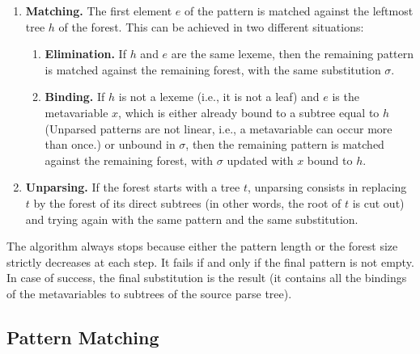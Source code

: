 \begin{enumerate}

  \item \textbf{Matching.} The first element \(e\) of the pattern is
    matched against the leftmost tree \(h\) of the forest. This can be
    achieved in two different situations:
    \begin{enumerate}
    
      \item \textbf{Elimination.} If \(h\) and \(e\) are the same
        lexeme, then the remaining pattern is matched against the
        remaining forest, with the same substitution \(\sigma\).

      \item \textbf{Binding.} If \(h\) is not a lexeme (i.e., it is
        not a leaf) and \(e\) is the meta\-variable \(x\), which is
        either already bound to a subtree equal to \(h\) (Unparsed
        patterns are not linear, i.e., a meta\-variable can occur more
        than once.) or unbound in \(\sigma\), then the remaining
        pattern is matched against the remaining forest, with
        \(\sigma\) updated with \(x\) bound to \(h\).

  \end{enumerate}

  \item \textbf{Unparsing.} If the forest starts with a tree \(t\),
    unparsing consists in replacing \(t\) by the forest of its direct
    subtrees (in other words, the root of \(t\) is cut out) and trying
    again with the same pattern and the same substitution.

\end{enumerate}
The algorithm always stops because either the pattern length or the
forest size strictly decreases at each step. It fails if and only if
the final pattern is not empty. In case of success, the final
substitution is the result (it contains all the bindings of the
meta\-variables to subtrees of the source parse tree).


\subsection{Pattern Matching}
\label{backtracking:definitions}

